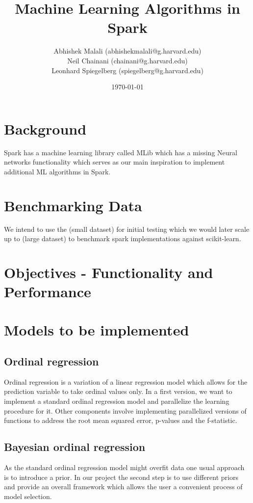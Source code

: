 \documentclass{article}
\begin{document}
	\title{Machine Learning Algorithms in Spark}
	\author{Abhishek Malali (abhishekmalali@g.harvard.edu)\\
			Neil Chainani (chainani@g.harvard.edu)\\
			Leonhard Spiegelberg (spiegelberg@g.harvard.edu)}
	\date{\today}
	\maketitle
	\section{Background}
	Spark has a machine learning library called MLib which has a missing Neural networks functionality which serves as our main inspiration to implement additional ML algorithms in Spark.

	\section{Benchmarking Data}
	We intend to use the (small dataset) for initial testing which we would later scale up to (large dataset) to benchmark spark implementations against scikit-learn. 


	\section{Objectives - Functionality and Performance}

	\section{Models to be implemented}
	\subsection{Ordinal regression}
	Ordinal regression is a variation of a linear regression model which allows for the prediction variable to take ordinal values only. In a first version, we want to implement a standard ordinal regression model and parallelize the learning procedure for it. Other components involve implementing parallelized versions of functions to address the root mean squared error, p-values and the f-statistic. 
	\subsection{Bayesian ordinal regression}
	As the standard ordinal regression model might overfit data one usual approach is to introduce a prior. In our project the second step is to use different priors and provide an overall framework which allows the user a convenient process of model selection.
\end{document}
